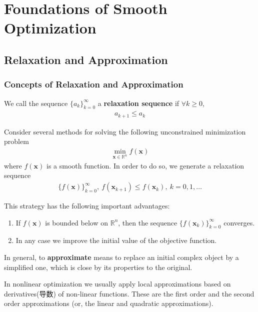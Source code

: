 \newpage
\section{Foundations of Smooth Optimization}

\subsection{Relaxation and Approximation}
\subsubsection{Concepts of Relaxation and Approximation}
We call the sequence $\{a_k \}_{k=0}^\infty$ a \textbf{relaxation sequence} if $\forall k\ge 0$,
\begin{align*}
    a_{k+1}\le a_k
\end{align*}

Consider several methods for solving the following unconstrained minimization problem
\begin{align}
    \min_{\bm x\in \mathbb{R}^n}f(\bm x)\label{c21}
\end{align}
where $f(\bm x)$ is a smooth function. In order to do so, we generate a relaxation sequence
\begin{align*}
    \{ f(\bm x) \}_{k=0}^\infty,\ f(\bm x_{k+1})\le f(\bm x_k),\ k=0,1,\dots
\end{align*}

This strategy has the following important advantages:
\begin{enumerate}
    \item If $f(\bm x)$ is bounded below on $\mathbb{R}^n$, then the sequence $\{ f(\bm x_k) \}_{k=0}^\infty$ converges. 
    \item In any case we improve the initial value of the objective function. 
\end{enumerate}
In general, to \textbf{approximate} means to replace an initial complex object by a simplified one, which is close by its properties to the original.

In nonlinear optimization we usually apply local approximations based on derivatives(导数) of non-linear functions. These are the first order and the second order approximations (or, the linear and quadratic approximations). 

